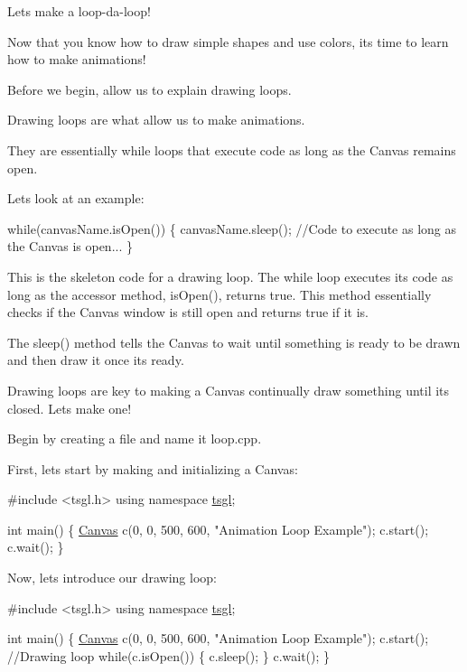 Let\textquotesingle{}s make a loop-\/da-\/loop!

Now that you know how to draw simple shapes and use colors, it\textquotesingle{}s time to learn how to make animations!

Before we begin, allow us to explain drawing loops.

Drawing loops are what allow us to make animations.

They are essentially while loops that execute code as long as the Canvas remains open.

Let\textquotesingle{}s look at an example\+:


\begin{DoxyCode}
\textcolor{keywordflow}{while}(canvasName.isOpen()) \{
   canvasName.sleep();
  \textcolor{comment}{//Code to execute as long as the Canvas is open...}
\}
\end{DoxyCode}
 This is the skeleton code for a drawing loop. The while loop executes its code as long as the accessor method, is\+Open(), returns {\ttfamily true}. This method essentially checks if the Canvas window is still open and returns {\ttfamily true} if it is.

The sleep() method tells the Canvas to wait until something is ready to be drawn and then draw it once its ready.

Drawing loops are key to making a Canvas continually draw something until its closed. Let\textquotesingle{}s make one!

Begin by creating a file and name it loop.\+cpp.

First, let\textquotesingle{}s start by making and initializing a Canvas\+:


\begin{DoxyCode}
\textcolor{preprocessor}{#include <tsgl.h>}
\textcolor{keyword}{using namespace }\hyperlink{namespacetsgl}{tsgl};

\textcolor{keywordtype}{int} main() \{
  \hyperlink{classtsgl_1_1_canvas}{Canvas} c(0, 0, 500, 600, \textcolor{stringliteral}{"Animation Loop Example"});
  c.start();
  c.wait();
\}
\end{DoxyCode}


Now, let\textquotesingle{}s introduce our drawing loop\+:


\begin{DoxyCode}
\textcolor{preprocessor}{#include <tsgl.h>}
\textcolor{keyword}{using namespace }\hyperlink{namespacetsgl}{tsgl};

\textcolor{keywordtype}{int} main() \{
  \hyperlink{classtsgl_1_1_canvas}{Canvas} c(0, 0, 500, 600, \textcolor{stringliteral}{"Animation Loop Example"});
  c.start();
  \textcolor{comment}{//Drawing loop}
  \textcolor{keywordflow}{while}(c.isOpen()) \{
    c.sleep();
  \}
  c.wait();
\}
\end{DoxyCode}


